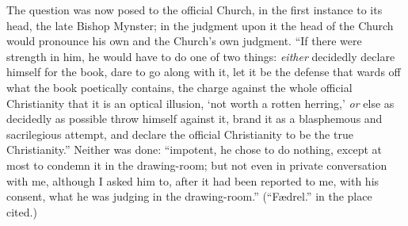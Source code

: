 \documentclass[12pt,a4paper]{article}
\begin{document}
The question was now posed to the official Church, in the first instance to its
head, the late Bishop Mynster; in the judgment upon it the head of the Church
would pronounce his own and the Church's own judgment. ``If there were strength in
him, he would have to do one of two things: \emph{either} decidedly declare himself for
the book, dare to go along with it, let it be the defense that wards off what the
book poetically contains, the charge against the whole official Christianity that
it is an optical illusion, `not worth a rotten herring,' \emph{or} else as decidedly as
possible throw himself against it, brand it as a blasphemous and sacrilegious
attempt, and declare the official Christianity to be the true Christianity.''
Neither was done: ``impotent, he chose to do nothing, except at most to condemn it
in the drawing-room; but not even in private conversation with me, although I asked
him to, after it had been reported to me, with his consent, what he was
judging in the drawing-room.'' (``Fædrel.'' in the place cited.)
\end{document}
